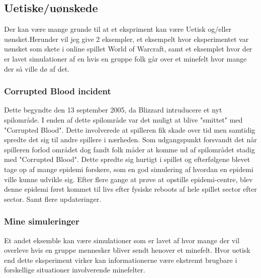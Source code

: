 \subsection{Uetiske/uønskede}
Der kan være mange grunde til at et ekspriment kan være Uetisk og/eller uønsket.Herunder vil jeg give 2 eksempler, et eksempelt hvor eksperimentet var uønsket som skete i online spillet World of Warcraft, samt et eksemplet hvor der er lavet simulationer af en hvis en gruppe folk går over et minefelt hvor mange der så ville dø af det.
\subsubsection{Corrupted Blood incident}
Dette begyndte den 13 september 2005, da Blizzard intruducere et nyt spilområde.
I enden af dette spilområde var det muligt at blive "smittet" med "Corrupted Blood". Dette involverede at spilleren fik skade over tid men samtidig spredte det sig til andre spillere i nærheden.
Som udgangspunkt forsvandt det når spilleren forlod området dog fandt folk måder at komme ud af spilområdet stadig med "Corrupted Blood".
Dette spredte sig hurtigt i spillet og efterfølgene blevet tage op af mange epidemi forskere, som en god simulering af hvordan en epidemi ville kunne udvikle sig. Efter flere gange at prøve at opstille epidemi-centre, blev denne epidemi først kommet til livs efter fysiske reboots af hele spillet sector efter sector. Samt flere updateringer. 
\subsubsection{Mine simuleringer}
Et andet eksemble kan være simulationer som er lavet af hvor mange der vil overleve hvis en gruppe mennesker bliver sendt henover et minefelt. Hvor uetisk end dette eksperiment virker kan informationerne være ekstremt brugbare i forskellige situationer involverende minefelter.
